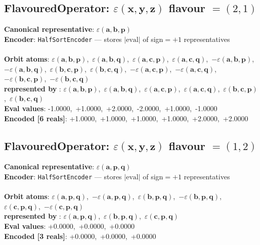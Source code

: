 \documentclass[a4paper,11pt]{article}
\newcommand{\kblbmcpggoncpf}[3]{\varepsilon(\mathbf{#1},\mathbf{#2},\mathbf{#3})}
\begin{document}
\subsection{FlavouredOperator: $\kblbmcpggoncpf{x}{y}{z}$  flavour $= (2, 1)$}
\textbf{  Canonical representative}: $\displaystyle\kblbmcpggoncpf{a}{b}{p}$\\
\textbf{  Encoder}: \texttt{HalfSortEncoder} — stores $|\text{eval}|$ of sign$=+1$ representatives\\\\
\textbf{  Orbit atoms}: $\kblbmcpggoncpf{a}{b}{p}$,\ $\kblbmcpggoncpf{a}{b}{q}$,\ $\kblbmcpggoncpf{a}{c}{p}$,\ $\kblbmcpggoncpf{a}{c}{q}$,\ $-\kblbmcpggoncpf{a}{b}{p}$,\ $-\kblbmcpggoncpf{a}{b}{q}$,\ $\kblbmcpggoncpf{b}{c}{p}$,\ $\kblbmcpggoncpf{b}{c}{q}$,\ $-\kblbmcpggoncpf{a}{c}{p}$,\ $-\kblbmcpggoncpf{a}{c}{q}$,\ $-\kblbmcpggoncpf{b}{c}{p}$,\ $-\kblbmcpggoncpf{b}{c}{q}$\\
\textbf{  represented by }: $\kblbmcpggoncpf{a}{b}{p}$,\ $\kblbmcpggoncpf{a}{b}{q}$,\ $\kblbmcpggoncpf{a}{c}{p}$,\ $\kblbmcpggoncpf{a}{c}{q}$,\ $\kblbmcpggoncpf{b}{c}{p}$,\ $\kblbmcpggoncpf{b}{c}{q}$\\
\textbf{  Eval values}: -1.0000,\ +1.0000,\ +2.0000,\ -2.0000,\ +1.0000,\ -1.0000\\
\textbf{  Encoded [6 reals]}: +1.0000,\ +1.0000,\ +1.0000,\ +1.0000,\ +2.0000,\ +2.0000\\

\subsection{FlavouredOperator: $\kblbmcpggoncpf{x}{y}{z}$  flavour $= (1, 2)$}
\textbf{  Canonical representative}: $\displaystyle\kblbmcpggoncpf{a}{p}{q}$\\
\textbf{  Encoder}: \texttt{HalfSortEncoder} — stores $|\text{eval}|$ of sign$=+1$ representatives\\\\
\textbf{  Orbit atoms}: $\kblbmcpggoncpf{a}{p}{q}$,\ $-\kblbmcpggoncpf{a}{p}{q}$,\ $\kblbmcpggoncpf{b}{p}{q}$,\ $-\kblbmcpggoncpf{b}{p}{q}$,\ $\kblbmcpggoncpf{c}{p}{q}$,\ $-\kblbmcpggoncpf{c}{p}{q}$\\
\textbf{  represented by }: $\kblbmcpggoncpf{a}{p}{q}$,\ $\kblbmcpggoncpf{b}{p}{q}$,\ $\kblbmcpggoncpf{c}{p}{q}$\\
\textbf{  Eval values}: +0.0000,\ +0.0000,\ +0.0000\\
\textbf{  Encoded [3 reals]}: +0.0000,\ +0.0000,\ +0.0000\\
\end{document}
